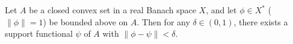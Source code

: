 Let $A$ be a closed convex set in a real Banach space $X$, and let $\phi \in X^*$ ($\|\phi\| = 1$) be bounded above on $A$. Then for any $\delta \in (0, 1)$, there exists a support functional $\psi$ of $A$ with $\|\phi - \psi\| < \delta$.